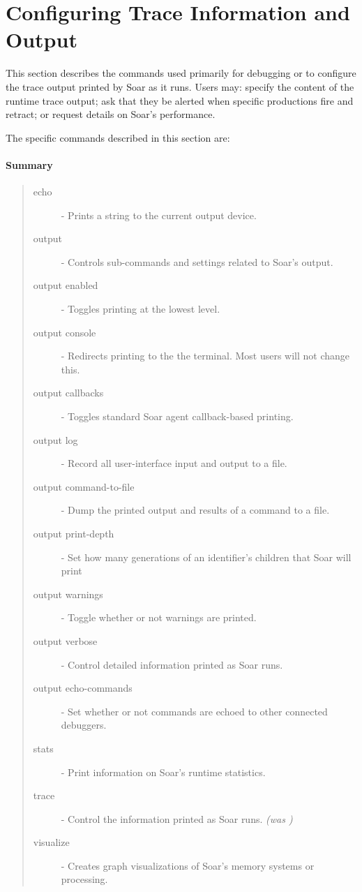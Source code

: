 \divider 

\divider 

\divider 

\divider 

\divider 

\section{Configuring Trace Information and Output}
\label{DEBUG}

This section describes the commands used primarily for debugging or
to configure the trace output printed by Soar as it runs.  Users may:
specify the content of the runtime trace output; ask that
they be alerted when specific productions fire and retract; 
or request details on Soar's performance.

The specific commands described in this section are:


\paragraph{Summary}
\begin{quote}
\begin{description}
\item[echo] - Prints a string to the current output device.
\item[output] - Controls sub-commands and settings related to Soar's output.
\item[output enabled] - Toggles printing at the lowest level.
\item[output console] - Redirects printing to the the terminal.  Most users will not change this.
\item[output callbacks] - Toggles standard Soar agent callback-based printing.
\item[output log] - Record all user-interface input and output to a file. 
\item[output command-to-file] - Dump the printed output and results of a command to a file.
\item[output print-depth] - Set how many generations of an identifier's children that Soar will print
\item[output warnings] - Toggle whether or not warnings are printed.
\item[output verbose] - Control detailed information printed as Soar runs.
\item[output echo-commands] - Set whether or not commands are echoed to other connected debuggers. 
\item[stats] - Print information on Soar's runtime statistics.
\item[trace] - Control the information printed as Soar runs. \emph{(was )}
\item[visualize] - Creates graph visualizations of Soar's memory systems or processing.
\end{description}
\end{quote}

